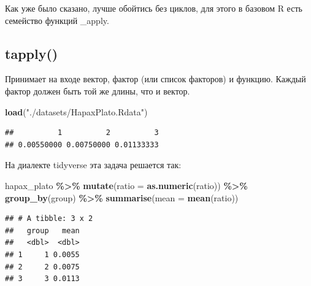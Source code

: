 \documentclass[
]{book}
\newenvironment{Shaded}{\begin{snugshade}}{\end{snugshade}}
\newcommand{\AttributeTok}[1]{\textcolor[rgb]{0.13,0.29,0.53}{#1}}
\newcommand{\FunctionTok}[1]{\textcolor[rgb]{0.13,0.29,0.53}{\textbf{#1}}}
\newcommand{\NormalTok}[1]{#1}
\newcommand{\OtherTok}[1]{\textcolor[rgb]{0.56,0.35,0.01}{#1}}
\newcommand{\SpecialCharTok}[1]{\textcolor[rgb]{0.81,0.36,0.00}{\textbf{#1}}}
\newcommand{\StringTok}[1]{\textcolor[rgb]{0.31,0.60,0.02}{#1}}
\theoremstyle{definition}
\theoremstyle{definition}
\theoremstyle{definition}
\theoremstyle{definition}
\theoremstyle{remark}
\begin{document}
Как уже было сказано, лучше обойтись без циклов, для этого в базовом R есть семейство функций \_apply.

\hypertarget{tapply}{%
\subsection{tapply()}\label{tapply}}

Принимает на входе вектор, фактор (или список факторов) и функцию. Каждый фактор должен быть той же длины, что и вектор.

\begin{Shaded}
\begin{Highlighting}[]
\FunctionTok{load}\NormalTok{(}\StringTok{"./datasets/HapaxPlato.Rdata"}\NormalTok{)}
\end{Highlighting}
\end{Shaded}

\begin{Shaded}
\end{Shaded}

\begin{verbatim}
##          1          2          3 
## 0.00550000 0.00750000 0.01133333
\end{verbatim}

На диалекте tidyverse эта задача решается так:

\begin{Shaded}
\begin{Highlighting}[]
\NormalTok{hapax\_plato }\SpecialCharTok{\%\textgreater{}\%} 
  \FunctionTok{mutate}\NormalTok{(}\AttributeTok{ratio =} \FunctionTok{as.numeric}\NormalTok{(ratio)) }\SpecialCharTok{\%\textgreater{}\%} 
  \FunctionTok{group\_by}\NormalTok{(group) }\SpecialCharTok{\%\textgreater{}\%} 
  \FunctionTok{summarise}\NormalTok{(}\AttributeTok{mean =} \FunctionTok{mean}\NormalTok{(ratio))}
\end{Highlighting}
\end{Shaded}

\begin{verbatim}
## # A tibble: 3 x 2
##   group   mean
##   <dbl>  <dbl>
## 1     1 0.0055
## 2     2 0.0075
## 3     3 0.0113
\end{verbatim}
\end{document}
